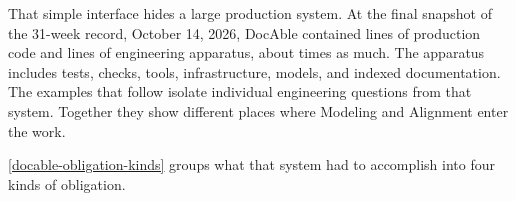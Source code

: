 
That simple interface hides a large production system. At the final snapshot of the 31-week record, October 14, 2026, DocAble contained  lines of production code and  lines of engineering apparatus, about  times as much. The apparatus includes tests, checks, tools, infrastructure, models, and indexed documentation. The examples that follow isolate individual engineering questions from that system. Together they show different places where Modeling and Alignment enter the work.


\autoref{docable-obligation-kinds} groups what that system had to accomplish into four kinds of obligation.

